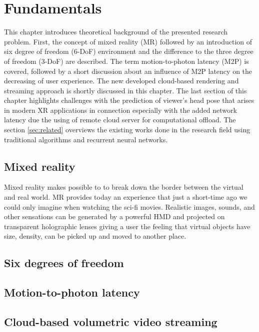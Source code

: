 
\chapter{Fundamentals}
\label{sec:theorie}
This chapter introduces theoretical background of the presented research problem. First, the concept of mixed reality (MR) followed by an introduction of six degree of freedom (6-DoF) environment and the difference to the three degree of freedom (3-DoF) are described. The term motion-to-photon latency (M2P) is covered, followed by a short discussion about an influence of M2P latency on the decreasing of user experience. The new developed cloud-based rendering and streaming approach is shortly discussed in this chapter. The last section of this chapter highlights challenges with the prediction of viewer's head pose that arises in modern XR applications in connection especially with the added network latency due the using of remote cloud server for computational offload. The section \ref{sec:related} overviews the existing works done in the research field using traditional algorithms and recurrent neural networks. 

\section{Mixed reality}
\label{sec:theorie:ar}
Mixed reality makes possible to to break down the border between the virtual and real world. MR provides today an experience that just a short-time ago we could only imagine when watching the sci-fi movies. Realistic images, sounds, and other sensations can be generated by a powerful HMD and projected on transparent holographic lenses giving a user the feeling that virtual objects have size, density, can be picked up and moved to another place.


\section{Six degrees of freedom}
\label{sec:theorie:6dof} 

\section{Motion-to-photon latency}
\label{sec:theorie:m2p}

\section{Cloud-based volumetric video streaming}
\label{sec:theorie:cloud}

